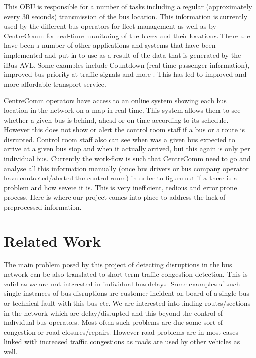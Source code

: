 This OBU is responsible for a number of tasks including a regular (approximately every 30 seconds) transmission of the bus location. This information is currently used by the different bus operators for fleet management as well as by CentreComm for real-time monitoring of the buses and their locations. There are have been a number of other applications and systems that have been implemented and put in to use as a result of the data that is generated by the iBus AVL. Some examples include Countdown (real-time passenger information), improved bus priority at traffic signals and more \cite{Hounsell201276}. This has led to improved and more affordable transport service.

CentreComm operators have access to an online system showing each bus location in the network on a map in real-time. This system allows them to see whether a given bus is behind, ahead or on time according to its schedule. However this does not show or alert the control room staff if a bus or a route is disrupted. Control room staff also can see when was a given bus expected to arrive at a given bus stop and when it actually arrived, but this again is only per individual bus. Currently the work-flow is such that CentreComm need to go and analyse all this information manually (once bus drivers or bus company operator have contacted/alerted the control room) in order to figure out if a there is a problem and how severe it is. This is very inefficient, tedious and error prone process. Here is where our project comes into place to address the lack of preprocessed information.

\section{Related Work}
The main problem posed by this project of detecting disruptions in the bus network can be also translated to short term traffic congestion detection. This is valid as we are not interested in individual bus delays. Some examples of such single instances of bus disruptions are customer incident on board of a single bus or technical fault with this bus etc. We are interested into finding routes/sections in the network which are delay/disrupted and this beyond the control of individual bus operators. Most often such problems are due some sort of congestion or road closures/repairs. However road problems are in most cases linked with increased traffic congestions as roads are used by other vehicles as well.

